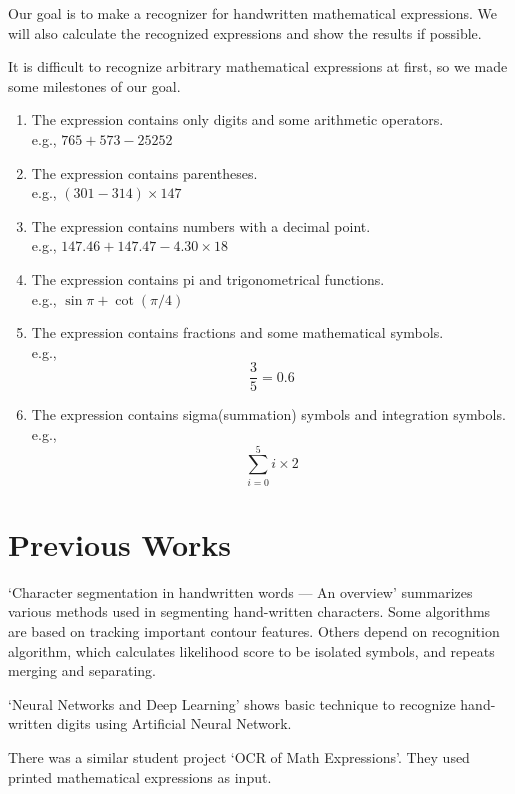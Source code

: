 \documentclass[10pt,twocolumn,letterpaper]{article}
\begin{document}
Our goal is to make a recognizer for handwritten mathematical expressions. We will also calculate the recognized expressions and show the results if possible.

It is difficult to recognize arbitrary mathematical expressions at first, so we made some milestones of our goal.

\begin{enumerate}
\item The expression contains only digits and some arithmetic operators. \\
e.g., $765+573-25252$

\item The expression contains parentheses. \\
e.g., $(301-314)\times 147$

\item The expression contains numbers with a decimal point. \\
e.g., $147.46 + 147.47 - 4.30 \times 18$

\item The expression contains pi and trigonometrical functions. \\
e.g., $\sin \pi + \cot (\pi / 4)$

\item The expression contains fractions and some mathematical symbols. \\
e.g., $$ \frac{3}{5} = 0.6 $$

\item The expression contains sigma(summation) symbols and integration symbols. \\
e.g., $$ \sum_{i=0}^{5} i \times 2 $$

\end{enumerate}

\section{Previous Works}
`Character segmentation in handwritten words — An overview'
\cite{Lu199677} summarizes various methods used in segmenting hand-written characters.
Some algorithms are based on tracking important contour features.
Others depend on recognition algorithm,
which calculates likelihood score to be isolated symbols,
and repeats merging and separating.

`Neural Networks and Deep Learning' \cite{MichaelNielsen} shows basic technique to recognize hand-written digits using Artificial Neural Network.

There was a similar student project `OCR of Math Expressions'\cite{OCRMATH}.
They used printed mathematical expressions as input.
\end{document}
